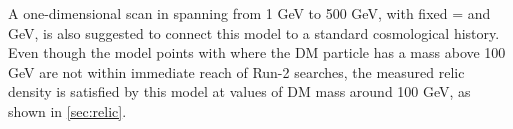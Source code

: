 A one-dimensional scan in \mDM spanning from 1 GeV to 500 GeV, with fixed \mA= and  GeV, is also suggested to connect this model to a standard cosmological history. Even though the model points with where the DM particle has a mass above 100 GeV are not within immediate reach of Run-2 searches, the measured relic density is satisfied by this model at values of DM mass around 100 GeV, as shown in \autoref{sec:relic}.

%
%
%
%
%
%
%
%
%
%
%
%
%
%
%
%
%
%
%
%
%



